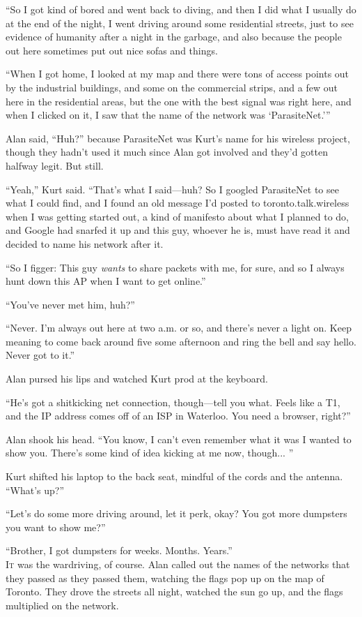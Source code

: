 \documentclass{article}
\begin{document}
``So I got kind of bored and went back to diving, and then I did what
I usually do at the end of the night, I went driving around some
residential streets, just to see evidence of humanity after a night in
the garbage, and also because the people out here sometimes put out
nice sofas and things.

``When I got home, I looked at my map and there were tons of access
points out by the industrial buildings, and some on the commercial
strips, and a few out here in the residential areas, but the one with
the best signal was right here, and when I clicked on it, I saw that
the name of the network was `ParasiteNet.'''

Alan said, ``Huh?'' because ParasiteNet was Kurt's name for his
wireless project, though they hadn't used it much since Alan got
involved and they'd gotten halfway legit.  But still.

``Yeah,'' Kurt said.  ``That's what I said---huh?  So I googled
ParasiteNet to see what I could find, and I found an old message I'd
posted to toronto.talk.wireless when I was getting started out, a kind
of manifesto about what I planned to do, and Google had snarfed it up
and this guy, whoever he is, must have read it and decided to name his
network after it.

``So I figger:  This guy \textit{wants} to share packets with me, for
sure, and so I always hunt down this AP when I want to get online.''

``You've never met him, huh?''

``Never.  I'm always out here at two a.m.  or so, and there's never a
light on.  Keep meaning to come back around five some afternoon and
ring the bell and say hello.  Never got to it.''

Alan pursed his lips and watched Kurt prod at the keyboard.

``He's got a shitkicking net connection, though---tell you what. 
Feels like a T1, and the IP address comes off of an ISP in Waterloo. 
You need a browser, right?''

Alan shook his head.  ``You know, I can't even remember what it was I
wanted to show you.  There's some kind of idea kicking at me now,
though...  ''

Kurt shifted his laptop to the back seat, mindful of the cords and the
antenna.  ``What's up?''

``Let's do some more driving around, let it perk, okay?  You got more
dumpsters you want to show me?''

``Brother, I got dumpsters for weeks.  Months.  Years.''
\\
\lettrine[lines=3, lhang=.5, nindent=0pt, findent=2pt]{I}{t} was the wardriving, of course.  Alan called out the names of the
networks that they passed as they passed them, watching the flags pop
up on the map of Toronto.  They drove the streets all night, watched
the sun go up, and the flags multiplied on the network.
\end{document}
